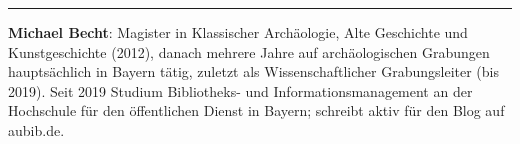 \begin{center}\rule{0.5\linewidth}{0.5pt}\end{center}

\textbf{Michael Becht}: Magister in Klassischer Archäologie, Alte
Geschichte und Kunstgeschichte (2012), danach mehrere Jahre auf
archäologischen Grabungen hauptsächlich in Bayern tätig, zuletzt als
Wissenschaftlicher Grabungsleiter (bis 2019). Seit 2019 Studium
Bibliotheks- und Informationsmanagement an der Hochschule für den
öffentlichen Dienst in Bayern; schreibt aktiv für den Blog auf aubib.de.
